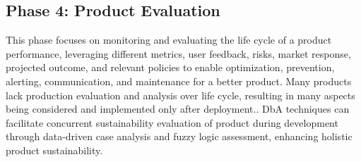 \subsection{Phase 4: Product Evaluation} This phase focuses on monitoring and evaluating the life cycle of a product performance, leveraging different metrics, user feedback, risks, market response, projected outcome, and relevant policies to enable optimization, prevention, alerting, communication, and maintenance for a better product\cite{moreno2014fundamental}. Many products lack production evaluation and analysis over life cycle, resulting in many aspects being considered and implemented only after deployment.\cite{zhong2017intelligent}. DbA techniques can facilitate concurrent sustainability evaluation of product during development through data-driven case analysis and fuzzy logic assessment, enhancing holistic product sustainability\cite{liao2021priming}.

